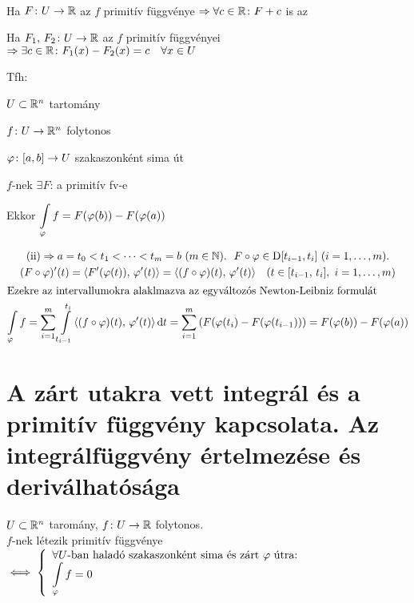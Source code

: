 \begin{te}\ 
  \begin{enumzjromai}
  \item Ha $F\colon U\to\mathbb{R}$ az $f$ primitív függvénye $\Rightarrow \forall c\in\mathbb{R}\colon F+c$ is az
  \item Ha $F_1,\,F_2\colon U\to\mathbb{R}$ az $f$ primitív függvényei $\Rightarrow \exists c\in\mathbb{R}\colon F_1(x)-F_2(x) = c \quad \forall
  x\in U$
  \end{enumzjromai}
\end{te}
\begin{te}
  Tfh:
\begin{enumzjromai}
  \item $U\subset \mathbb{R}^n$ tartomány
  \item $f\colon U\to \mathbb{R}^n$ folytonos
  \item $\varphi\colon [a,b]\to U$ szakaszonként sima út
  \item $f$-nek $\exists F$: a primitív fv-e
\end{enumzjromai}
Ekkor $\di\Int_\vfi f = F(\vfi(b))-F(\vfi(a))$
\end{te}
\begin{biz}
\begin{gather*}\text{(ii)}\nn a=t_0<t_1<\dotsb<t_m=b\ (m\in\N).\ \ F\circ\vfi\in\Der[t_{i-1},t_i]\ (i=1,\dotsc,m).\\
  (F\circ\vfi)'(t)=\skalar{F'(\vfi(t))}{\vfi'(t)}=\skalar{(f\circ\vfi)(t)}{\vfi'(t)}\quad(t\in[t_{i-1},\,t_i],\
  i=1,\dotsc,m)\\
  \intertext{Ezekre az intervallumokra alaklmazva az egyváltozós Newton-Leibniz formulát}
  \Int_\vfi f=\sum_{i=1}^m\Int_{t_{i-1}}^{t_i}\skalar{(f\circ\vfi)(t)}{\vfi'(t)}\diff t = \sum_{i=1}^m
  \left(F(\vfi(t_i)-F(\vfi(t_{i-1}))\right) = F(\vfi(b))-F(\vfi(a))
\end{gather*}
\end{biz}

\newpage
\section{A zárt utakra vett integrál és a primitív függvény kapcsolata. Az integrálfüggvény értelmezése és
  deriválhatósága}
\begin{te}
  $U\subset \mathbb{R}^n$ taromány, $f\colon U\to\mathbb{R}$ folytonos.\\
  $f$-nek létezik primitív függvénye $\ekviv \left\{\begin{array}{l}\forall U\text{-ban haladó szakaszonként sima és
  zárt }\vfi\text{ útra:}\\\di\Int_\vfi f= 0\end{array}\right.$
\end{te}

